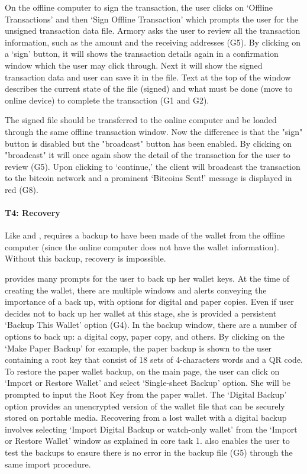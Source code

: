 On the offline computer to sign the transaction, the user clicks on `Offline Transactions' and then `Sign Offline Transaction' which prompts the user for the unsigned transaction data file. Armory asks the user to review all the transaction information, such as the amount and the receiving addresses (G5). By clicking on a `sign' button, it will shows the transaction details again in a confirmation window which the user may click through. Next it will show the signed transaction data and user can save it in the file. Text at the top of the window describes the current state of the file (signed) and what must be done (move to online device) to complete the transaction (G1 and G2).

The signed file should be transferred to the online computer and be loaded through the same offline transaction window. Now the difference is that the "sign" button is disabled but the "broadcast" button has been enabled. By clicking on "broadcast" it will once again show the detail of the transaction for the user to review (G5). Upon clicking to `continue,' the client will broadcast the transaction to the bitcoin network and a prominent `Bitcoins Sent!' message is displayed in red (G8).

\paragraph{T4: Recovery}

Like \bitcoinclient and \multibit, \armory requires a backup to have been made of the wallet from the offline computer (since the online computer does not have the wallet information). Without this backup, recovery is impossible.

\armory provides many prompts for the user to back up her wallet keys. At the time of creating the wallet, there are multiple windows and alerts conveying the importance of a back up, with options for digital and paper copies. Even if user decides not to back up her wallet at this stage, she is provided a persistent `Backup This Wallet' option (G4). In the backup window, there are a number of options to back up: a digital copy, paper copy, and others. By clicking on the `Make Paper Backup' for example, the paper backup is shown to the user containing a root key that consist of 18 sets of 4-characters words and a QR code. To restore the paper wallet backup, on the main page, the user can click on `Import or Restore Wallet' and select `Single-sheet Backup' option. She will be prompted to input the Root Key from the paper wallet. The `Digital Backup' option provides an unencrypted version of the wallet file that can be securely stored on portable media. Recovering from a lost wallet with a digital backup involves selecting `Import Digital Backup or watch-only wallet' from the `Import or Restore Wallet' window as explained in core task 1. \armory also enables the user to test the backups to ensure there is no error in the backup file (G5) through the same import procedure.

